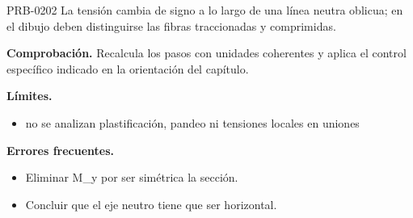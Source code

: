 \begin{studiumworked}{PRB-0202}
La tensión cambia de signo a lo largo de una línea neutra oblicua; en el dibujo deben distinguirse las fibras traccionadas y comprimidas.

\par\textbf{Comprobación.} Recalcula los pasos con unidades coherentes y aplica el control específico indicado en la orientación del capítulo.

\textbf{Límites.}\begin{itemize}\item no se analizan plastificación, pandeo ni tensiones locales en uniones\end{itemize}

\textbf{Errores frecuentes.}\begin{itemize}\item Eliminar M\_y por ser simétrica la sección.
\item Concluir que el eje neutro tiene que ser horizontal.\end{itemize}

\end{studiumworked}

\Needspace{.3\textheight}

